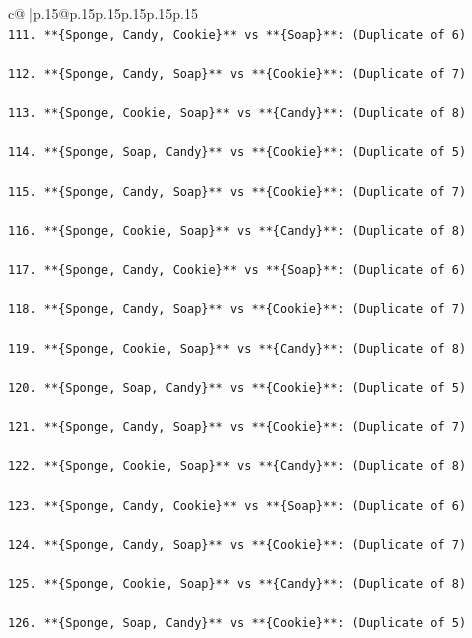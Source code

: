 \documentclass{article}
\begin{document}
{\begin{supertabular}{c@{$\;$}|p{.15\linewidth}@{}p{.15\linewidth}p{.15\linewidth}p{.15\linewidth}p{.15\linewidth}p{.15\linewidth}}
{{{\\ 
\texttt{111. **\{Sponge, Candy, Cookie\}** vs **\{Soap\}**: (Duplicate of 6)} \\
\\ 
\texttt{112. **\{Sponge, Candy, Soap\}** vs **\{Cookie\}**: (Duplicate of 7)} \\
\\ 
\texttt{113. **\{Sponge, Cookie, Soap\}** vs **\{Candy\}**: (Duplicate of 8)} \\
\\ 
\texttt{114. **\{Sponge, Soap, Candy\}** vs **\{Cookie\}**: (Duplicate of 5)} \\
\\ 
\texttt{115. **\{Sponge, Candy, Soap\}** vs **\{Cookie\}**: (Duplicate of 7)} \\
\\ 
\texttt{116. **\{Sponge, Cookie, Soap\}** vs **\{Candy\}**: (Duplicate of 8)} \\
\\ 
\texttt{117. **\{Sponge, Candy, Cookie\}** vs **\{Soap\}**: (Duplicate of 6)} \\
\\ 
\texttt{118. **\{Sponge, Candy, Soap\}** vs **\{Cookie\}**: (Duplicate of 7)} \\
\\ 
\texttt{119. **\{Sponge, Cookie, Soap\}** vs **\{Candy\}**: (Duplicate of 8)} \\
\\ 
\texttt{120. **\{Sponge, Soap, Candy\}** vs **\{Cookie\}**: (Duplicate of 5)} \\
\\ 
\texttt{121. **\{Sponge, Candy, Soap\}** vs **\{Cookie\}**: (Duplicate of 7)} \\
\\ 
\texttt{122. **\{Sponge, Cookie, Soap\}** vs **\{Candy\}**: (Duplicate of 8)} \\
\\ 
\texttt{123. **\{Sponge, Candy, Cookie\}** vs **\{Soap\}**: (Duplicate of 6)} \\
\\ 
\texttt{124. **\{Sponge, Candy, Soap\}** vs **\{Cookie\}**: (Duplicate of 7)} \\
\\ 
\texttt{125. **\{Sponge, Cookie, Soap\}** vs **\{Candy\}**: (Duplicate of 8)} \\
\\ 
\texttt{126. **\{Sponge, Soap, Candy\}** vs **\{Cookie\}**: (Duplicate of 5)} \\
}}}
\end{supertabular}}
\end{document}
